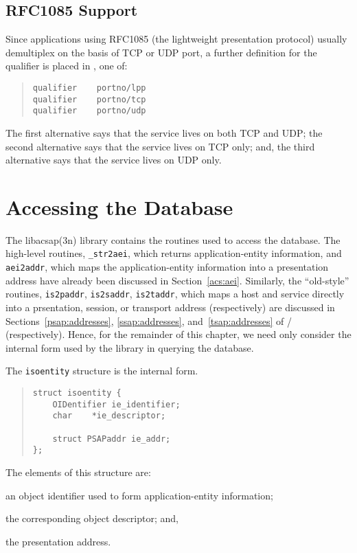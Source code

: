 \subsection*	{RFC1085 Support}
Since applications using RFC1085 (the lightweight presentation protocol)
usually demultiplex on the basis of TCP or UDP port,
a further definition for the qualifier is placed in
,
one of:
\begin{quote}\small\begin{verbatim}
qualifier    portno/lpp
qualifier    portno/tcp
qualifier    portno/udp
\end{verbatim}\end{quote}
The first alternative says that the service lives on both TCP and UDP;
the second alternative says that the service lives on TCP only;
and,
the third alternative says that the service lives on UDP only.

\section	{Accessing the Database}\label{isoentity}
The \man libacsap(3n) library contains the routines used to access the
database.
The high-level routines, \verb"_str2aei",
which returns application-entity information,
and \verb"aei2addr",
which maps the ap\-pli\-ca\-tion-entity information into a presentation
address have
already been discussed in Section~\ref{acs:aei}.
Similarly, the ``old-style'' routines,
\verb"is2paddr", \verb"is2saddr", \verb"is2taddr",
which maps a host and service directly into a prsentation, session,
or transport address (respectively) are discussed in
Sections~\ref{psap:addresses}, \ref{ssap:addresses}, and~\ref{tsap:addresses}
of \voltwo/ (respectively).
Hence, for the remainder of this chapter,
we need only consider the internal form used by the library in querying the
database.

The \verb"isoentity" structure is the internal form.
\begin{quote}\small\begin{verbatim}
struct isoentity {
    OIDentifier ie_identifier;
    char    *ie_descriptor;

    struct PSAPaddr ie_addr;
};
\end{verbatim}\end{quote}
The elements of this structure are:
\begin{describe}
\item[\verb"ie\_identifier":] an object identifier used to form
application-entity information;

\item[\verb"ie\_identifier":] the corresponding object descriptor;
and,

\item[\verb"ie\_addr":] the presentation address.
\end{describe}

